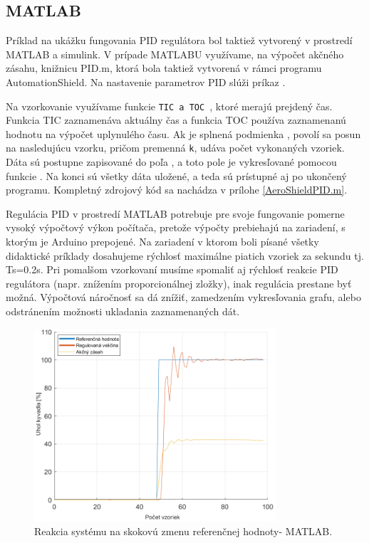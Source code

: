 
\subsection{MATLAB}
\label{MATLABPID}

Príklad na ukážku fungovania PID regulátora bol taktiež vytvorený v prostredí MATLAB a simulink. V prípade MATLABU využívame, na výpočet akčného zásahu, knižnicu PID.m, ktorá bola taktiež vytvorená v rámci programu AutomationShield. Na nastavenie parametrov PID slúži príkaz . 

Na vzorkovanie využívame funkcie \verb|TIC a TOC |, ktoré merajú prejdený čas. Funkcia TIC zaznamenáva aktuálny čas a funkcia TOC používa zaznamenanú hodnotu na výpočet uplynulého času. Ak je splnená podmienka , povolí sa posun na nasledujúcu vzorku, pričom premenná \verb*|k|, udáva počet vykonaných vzoriek. Dáta sú postupne zapisované do poľa , a toto pole je vykresľované pomocou funkcie . Na konci sú všetky dáta uložené, a teda sú prístupné aj po ukončený programu. Kompletný zdrojový kód sa nachádza v prílohe \ref{AeroShieldPID.m}.

Regulácia PID v prostredí MATLAB potrebuje pre svoje fungovanie pomerne vysoký výpočtový výkon počítača, pretože výpočty prebiehajú na zariadení, s ktorým je Arduino prepojené. Na zariadení \cite{Notebook} v ktorom boli písané všetky didaktické príklady dosahujeme rýchlosť maximálne piatich vzoriek za sekundu tj. Ts=0.2s. Pri pomalšom vzorkovaní musíme spomaliť aj rýchlosť reakcie PID regulátora (napr. znížením proporcionálnej zložky), inak regulácia prestane byť možná. Výpočtová náročnosť sa dá znížiť, zamedzením vykresľovania grafu, alebo odstránením možnosti ukladania zaznamenaných dát. 

\begin{figure}[!tbh]
	\centering
	\includegraphics[width=90mm]{obr/jednotkovyskoskMAt.png}
	\caption{Reakcia systému na skokovú zmenu referenčnej hodnoty- MATLAB.}\label{OBRAZOK 2.6.1}
\end{figure}

